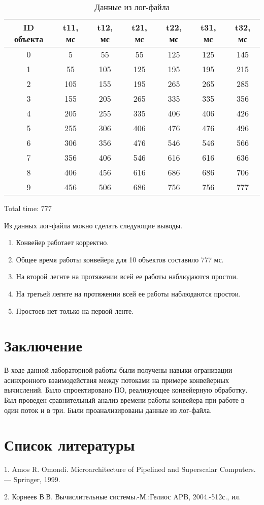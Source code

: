 \documentclass[a4paper,14pt]{report}
\begin{document}
\begin{table}[!h]
	\caption{Данные из лог-файла}
	\tabcolsep=0.11cm
		\begin{tabular}{| c | c | c | c | c | c | c |}
	 	\hline
		ID объекта & t11, мс & t12, мс & t21, мс & t22, мс & t31, мс & t32, мс \\ [0.5ex]
	 	\hline\hline
		0	& 5 & 55 & 55 & 125 & 125 & 145 \\ \hline
		1	&	55 & 105 & 125 & 195 & 195 & 215 \\ \hline
		2	&	105 & 155 & 195 & 265 & 265 & 285 \\ \hline
		3	&	155 & 205 & 265 & 335 & 335 & 356 \\ \hline
		4	&	205 & 255 & 335 & 406 & 406 & 426 \\ \hline
		5	&	255 & 306 & 406 & 476 & 476 & 496 \\ \hline
		6	&	306 & 356 & 476 & 546 & 546 & 566 \\ \hline
		7	&	356 & 406 & 546 & 616 & 616 & 636 \\ \hline
		8	&	406 & 456 & 616 & 686 & 686 & 706 \\ \hline
		9	&	456 & 506 & 686 & 756 & 756 & 777 \\ \hline
	\end{tabular}
\end{table}

Total time: 777

Из данных лог-файла можно сделать следующие выводы.
\begin{enumerate}
	\item Конвейер работает корректно.
	\item Общее время работы конвейера для 10 объектов составило 777 мс.
	\item На второй легнте на протяжении всей ее работы наблюдаются простои.
	\item На третьей легнте на протяжении всей ее работы наблюдаются простои.
	\item Простоев нет только на первой ленте.
\end{enumerate}

\chapter*{Заключение}

В ходе данной лабораторной работы были получены навыки огранизации асинхронного взаимодействия между потоками на примере конвейерных вычислений. Было спроектировано ПО, реализующее конвейерную обработку. Был проведен сравнительный анализ времени работы конвейера при работе в один поток и в три. Были проанализированы данные из лог-файла.

\chapter*{Список литературы}

1. Amos R. Omondi. Microarchitecture of Pipelined and Superscalar Computers. — Springer, 1999.

2. Корнеев В.В. Вычислительные системы.-М.:Гелиос APB,  2004.-512с., ил.
\end{document}
